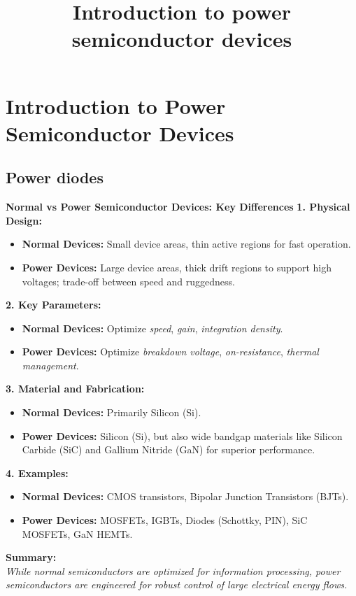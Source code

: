 \section{Introduction to Power Semiconductor Devices}
\title[Introduction to power semiconductor devices]{Introduction to power semiconductor devices}  

\subsection{Power diodes}

\begin{frame}[plain]
    \titlepage
\end{frame}

\begin{frame}{\textbf{Normal vs Power Semiconductor Devices: Key Differences}}
    \textbf{1. Physical Design:}
    \begin{itemize}
        \item \textbf{Normal Devices:} Small device areas, thin active regions for fast operation.
        \item \textbf{Power Devices:} Large device areas, thick drift regions to support high voltages; trade-off between speed and ruggedness.
    \end{itemize}

    \textbf{2. Key Parameters:}
    \begin{itemize}
        \item \textbf{Normal Devices:} Optimize \textit{speed}, \textit{gain}, \textit{integration density}.
        \item \textbf{Power Devices:} Optimize \textit{breakdown voltage}, \textit{on-resistance}, \textit{thermal management}.
    \end{itemize}

    \textbf{3. Material and Fabrication:}
    \begin{itemize}
        \item \textbf{Normal Devices:} Primarily Silicon (Si).
        \item \textbf{Power Devices:} Silicon (Si), but also wide bandgap materials like Silicon Carbide (SiC) and Gallium Nitride (GaN) for superior performance.
    \end{itemize}

    \textbf{4. Examples:}
    \begin{itemize}
        \item \textbf{Normal Devices:} CMOS transistors, Bipolar Junction Transistors (BJTs).
        \item \textbf{Power Devices:} MOSFETs, IGBTs, Diodes (Schottky, PIN), SiC MOSFETs, GaN HEMTs.
    \end{itemize}

    \vspace{0.3cm}
    \textbf{Summary:} \\
    \textit{While normal semiconductors are optimized for information processing, power semiconductors are engineered for robust control of large electrical energy flows.}
\end{frame}


